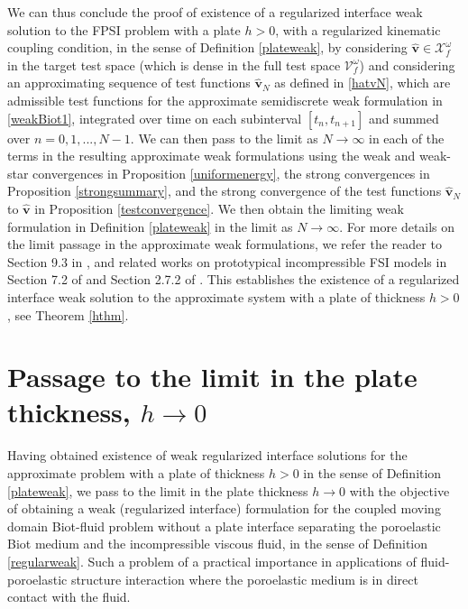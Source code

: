 \documentclass[11pt]{article}
\newcommand{\bd}{\boldsymbol}
\theoremstyle{definition}
\begin{document}
We can thus conclude the proof of existence of a regularized interface weak solution to the FPSI problem with a plate $h > 0$, with a regularized kinematic coupling condition, in the sense of Definition \ref{plateweak}, by considering $\hat{\bd{v}} \in \mathcal{X}^{\omega}_{f}$ in the target test space (which is dense in the full test space $\mathcal{V}^{\omega}_{f}$) and considering an approximating sequence of test functions $\hat{\bd{v}}_{N}$ as defined in \eqref{hatvN}, which are admissible test functions for the approximate semidiscrete weak formulation in \eqref{weakBiot1}, integrated over time on each subinterval $[t_{n}, t_{n + 1}]$ and summed over $n = 0, 1, ..., N - 1$. We can then pass to the limit as $N \to \infty$ in each of the terms in the resulting approximate weak formulations using the weak and weak-star convergences in Proposition \ref{uniformenergy}, the strong convergences in Proposition \ref{strongsummary}, and the strong convergence of the test functions $\hat{\bd{v}}_{N}$ to $\hat{\bd{v}}$ in Proposition \ref{testconvergence}. We then obtain the limiting weak formulation in Definition \ref{plateweak} in the limit as $N \to \infty$. For more details on the limit passage in the approximate weak formulations, we refer the reader to Section 9.3 in \cite{FPSIJMPA}, and related works on prototypical incompressible FSI models in Section 7.2 of \cite{MuhaCanic13} and Section 2.7.2 of \cite{CanicLectureNotes}. This establishes the existence of a regularized interface weak solution to the approximate system with a plate of thickness $h > 0$, see Theorem \ref{hthm}.

\section{Passage to the limit in the plate thickness, $h \to 0$}\label{finallimit}

Having obtained existence of weak regularized interface solutions for the approximate problem with a plate of thickness $h > 0$ in the sense of Definition \ref{plateweak}, we pass to the limit in the plate thickness $h \to 0$ with the objective of obtaining a weak (regularized interface) formulation for the coupled moving domain Biot-fluid problem without a plate interface separating the poroelastic Biot medium and the incompressible viscous fluid, in the sense of Definition \ref{regularweak}. Such a problem of a practical importance in applications of fluid-poroelastic structure interaction where the poroelastic medium is in direct contact with the fluid. 
\end{document}
